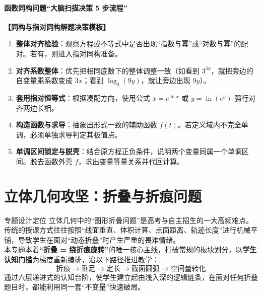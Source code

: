 \documentclass[11pt,a4paper]{ctexart}
\begin{document}
\subsection{函数同构问题“大脑扫描决策 5 步流程”}

\begin{center}
\begin{tcolorbox}[colback=white, colframe=black, boxrule=0.5pt, arc=0pt, left=8pt, right=8pt, top=8pt, bottom=8pt]
\textbf{【同构与指对同构解题决策模板】}
\begin{enumerate}[label=第\arabic*步：, leftmargin=3.5em]
  \item \textbf{整体对齐检验}：观察方程或不等式中是否出现“指数与幂”或“对数与幂”的配对。若有，则进入指对同构准备。
  \item \textbf{对齐系数整体}：优先把相同底数下的整体调整一致（如看到 $3^{3x}$，就把旁边的自变量乘系数变成 $3x$；看到 $\log_3(9y)$，就让旁边出现 $9y$）。
  \item \textbf{套用指对恒等式}：根据凑配方向，使用公式 $x = e^{\ln x}$ 或 $y = \ln(e^y)$ 强行对齐两边长相。
  \item \textbf{构造函数与求导}：抽象出形式一致的辅助函数 $f(t)$。若定义域内不完全单调，必须单独求导判定其极值点。
  \item \textbf{单调区间锁定与脱壳}：结合原方程正负条件，说明两个变量同属一个单调区间。脱去函数外壳 $f$，求出变量等量关系并代回计算。
\end{enumerate}
\end{tcolorbox}
\end{center}


\newpage
\part{立体几何攻坚：折叠与折痕问题}



\begin{teachbox}{专题设计定位}
立体几何中的“图形折叠问题”是高考与自主招生的一大高频难点。传统的授课方式往往按照“线面垂直、体积计算、点面距离、轨迹长度”进行机械平铺，导致学生在面对“动态折叠”时产生严重的畏难情绪。\\
本专题本着\textbf{“折叠 = 绕折痕旋转”}的唯一核心主线，打破常规的板块划分，以\textbf{学生认知门槛}为梯度重新编排，沿以下路径推进教学：\\
$$\text{折痕} \rightarrow \text{垂足} \rightarrow \text{定长} \rightarrow \text{截面圆弧} \rightarrow \text{空间量转化}$$
通过六层递进式的认知台阶，使学生建立起由浅入深的逻辑链条，在面对任何折叠题目时，都能利用同一套“不变量”快速破局。
\end{teachbox}
\end{document}
